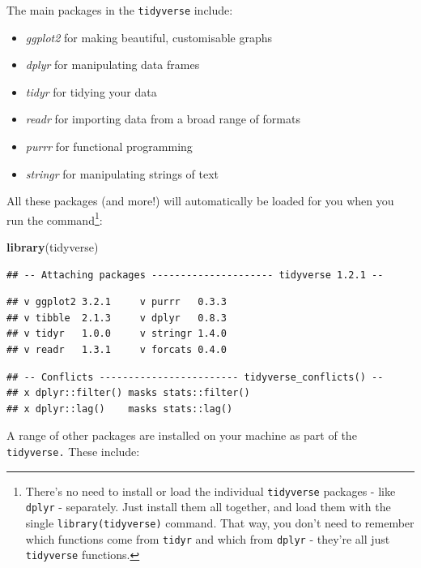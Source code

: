 \documentclass[]{book}
\newenvironment{Shaded}{\begin{snugshade}}{\end{snugshade}}
\newcommand{\KeywordTok}[1]{\textcolor[rgb]{0.13,0.29,0.53}{\textbf{#1}}}
\newcommand{\NormalTok}[1]{#1}
\providecommand{\tightlist}{%
  \setlength{\itemsep}{0pt}\setlength{\parskip}{0pt}}
\let\rmarkdownfootnote\footnote%
\def\footnote{\protect\rmarkdownfootnote}
\begin{document}
The main packages in the \texttt{tidyverse} include:

\begin{itemize}
\tightlist
\item
  \emph{ggplot2} for making beautiful, customisable graphs
\item
  \emph{dplyr} for manipulating data frames
\item
  \emph{tidyr} for tidying your data
\item
  \emph{readr} for importing data from a broad range of formats
\item
  \emph{purrr} for functional programming
\item
  \emph{stringr} for manipulating strings of text
\end{itemize}

All these packages (and more!) will automatically be loaded for you when you run the command\footnote{There's no need to install or load the individual \texttt{tidyverse} packages - like \texttt{dplyr} - separately. Just install them all together, and load them with the single \texttt{library(tidyverse)} command. That way, you don't need to remember which functions come from \texttt{tidyr} and which from \texttt{dplyr} - they're all just \texttt{tidyverse} functions.}:

\begin{Shaded}
\begin{Highlighting}[]
\KeywordTok{library}\NormalTok{(tidyverse)}
\end{Highlighting}
\end{Shaded}

\begin{verbatim}
## -- Attaching packages --------------------- tidyverse 1.2.1 --
\end{verbatim}

\begin{verbatim}
## v ggplot2 3.2.1     v purrr   0.3.3
## v tibble  2.1.3     v dplyr   0.8.3
## v tidyr   1.0.0     v stringr 1.4.0
## v readr   1.3.1     v forcats 0.4.0
\end{verbatim}

\begin{verbatim}
## -- Conflicts ------------------------ tidyverse_conflicts() --
## x dplyr::filter() masks stats::filter()
## x dplyr::lag()    masks stats::lag()
\end{verbatim}

A range of other packages are installed on your machine as part of the \texttt{tidyverse.} These include:
\end{document}
